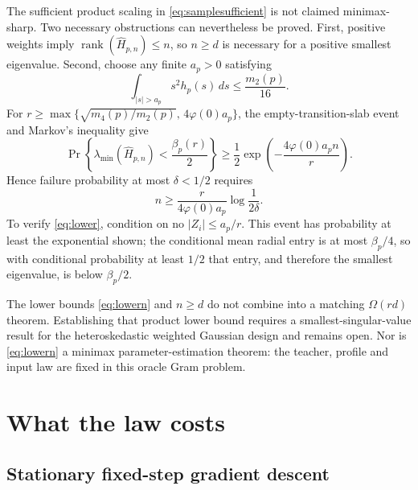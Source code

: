 \documentclass[11pt]{article}
\begin{document}
The sufficient product scaling in \eqref{eq:samplesufficient} is not claimed minimax-sharp.  Two necessary
obstructions can nevertheless be proved.  First, positive weights imply
$\operatorname{rank}(\widehat H_{p,n})\le n$, so $n\ge d$ is necessary for a positive smallest eigenvalue.
Second, choose any finite $a_p>0$ satisfying
\[
 \int_{|s|>a_p}s^2h_p(s)\,ds\le\frac{m_2(p)}{16}.
\]
For
$r\ge\max\{\sqrt{m_4(p)/m_2(p)},\,4\varphi(0)a_p\}$, the empty-transition-slab event and Markov's inequality give
\begin{equation}
 \Pr\!\left\{\lambda_{\min}(\widehat H_{p,n})<\frac{\beta_p(r)}2\right\}
 \ge\frac12\exp\!\left(-\frac{4\varphi(0)a_pn}{r}\right).
 \label{eq:lower}
\end{equation}
Hence failure probability at most $\delta<1/2$ requires
\begin{equation}
 n\ge\frac{r}{4\varphi(0)a_p}\log\frac1{2\delta}.
 \label{eq:lowern}
\end{equation}
To verify \eqref{eq:lower}, condition on no $|Z_i|\le a_p/r$.  This event has probability at least the exponential
shown; the conditional mean radial entry is at most $\beta_p/4$, so with conditional probability at least $1/2$
that entry, and therefore the smallest eigenvalue, is below $\beta_p/2$.

The lower bounds \eqref{eq:lowern} and $n\ge d$ do not combine into a matching $\Omega(rd)$ theorem.
Establishing that product lower bound requires a smallest-singular-value result for the heteroskedastic weighted
Gaussian design and remains open.  Nor is \eqref{eq:lowern} a minimax parameter-estimation theorem: the teacher,
profile and input law are fixed in this oracle Gram problem.

\section{What the law costs}

\subsection{Stationary fixed-step gradient descent}
\end{document}
